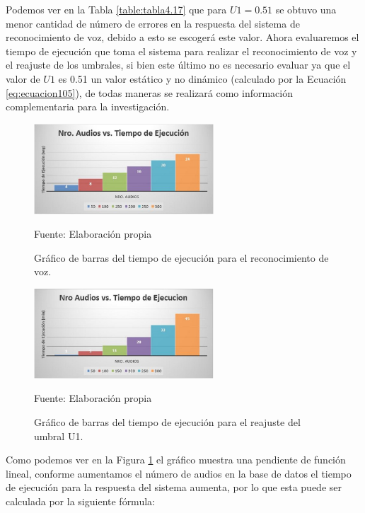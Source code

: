 Podemos ver en la Tabla \ref{table:tabla4.17} que para $U1 = 0.51$ se obtuvo una menor cantidad de número de errores en la respuesta del sistema de reconocimiento de voz, debido a esto se escogerá este valor.
\vskip 0.5cm
Ahora evaluaremos el tiempo de ejecución que toma el sistema para realizar el reconocimiento de voz y el reajuste de los umbrales, si bien este último no es necesario evaluar ya que el valor de $U1$ es 0.51 un valor estático y no dinámico (calculado por la Ecuación \eqref{eq:ecuacion105}), de todas maneras se realizará como información complementaria para la investigación.

\newpage
\begin{figure}[H]
\captionsetup{justification=centering}
\begin{center}
\includegraphics[width=0.6\textwidth]{Imagenes/Cap4/image005}
\end{center}
\begin{center}
\vskip -0.5cm
\caption{\small{Gráfico de barras del tiempo de ejecución para el reconocimiento de voz.}}
\label{fig:figura4.5}
{\small{Fuente: Elaboración propia}}
\end{center}
\end{figure}
\vskip -0.5cm
\begin{figure}[H]
\captionsetup{justification=centering}
\begin{center}
\includegraphics[width=0.6\textwidth]{Imagenes/Cap4/image006}
\end{center}
\begin{center}
\vskip -0.5cm
\caption{\small{Gráfico de barras del tiempo de ejecución para el reajuste del umbral U1.}}
\label{fig:figura4.6}
{\small{Fuente: Elaboración propia}}
\end{center}
\end{figure}
\vskip -0.5cm
Como podemos ver en la Figura \ref{fig:figura4.5} el gráfico muestra una pendiente de función lineal, conforme aumentamos el número de audios en la base de datos el tiempo de ejecución para la respuesta del sistema aumenta, por lo que esta puede ser calculada por la siguiente fórmula:

